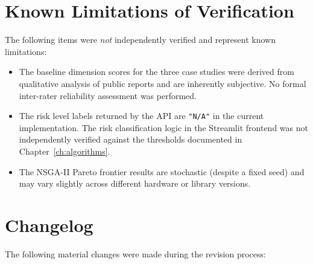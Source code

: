 \section{Known Limitations of Verification}

The following items were \emph{not} independently verified and represent known limitations:

\begin{itemize}[leftmargin=2em]
  \item The baseline dimension scores for the three case studies were derived from qualitative analysis of public reports and are inherently subjective. No formal inter-rater reliability assessment was performed.
  \item The risk level labels returned by the API are \texttt{"N/A"} in the current implementation. The risk classification logic in the Streamlit frontend was not independently verified against the thresholds documented in Chapter~\ref{ch:algorithms}.
  \item The NSGA-II Pareto frontier results are stochastic (despite a fixed seed) and may vary slightly across different hardware or library versions.
\end{itemize}

\section{Changelog}

The following material changes were made during the revision process:

